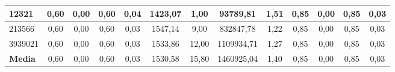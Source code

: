 \documentclass[12pt, spanish]{article}
\begin{document}
\begin{table}[H]
\begin{adjustwidth}{-1.2cm}{-1.2cm}
\begin{tabular}{|l|c|c|c|c|c|c|c|c|c|c|c|c|}
12321                                                   & 0,60                         & 0,00                           & 0,60                      & 0,04                   & 1423,07                      & 1,00                           & 93789,81                  & 1,51                   & 0,85                         & 0,00                           & 0,85                      & 0,03                   \\ \hline
213566                                                  & 0,60                         & 0,00                           & 0,60                      & 0,03                   & 1547,14                      & 9,00                           & 832847,78                 & 1,22                   & 0,85                         & 0,00                           & 0,85                      & 0,03                   \\ \hline
3939021                                                 & 0,60                         & 0,00                           & 0,60                      & 0,03                   & 1533,86                      & 12,00                          & 1109934,71                & 1,27                   & 0,85                         & 0,00                           & 0,85                      & 0,03                   \\ \hline
\textbf{Media}                                          & 0,60                         & 0,00                           & 0,60                      & 0,03                   & 1530,58                      & 15,80                          & 1460925,04                & 1,40                   & 0,85                         & 0,00                           & 0,85                      & 0,03                   \\ \hline
\end{tabular}

\end{adjustwidth}

\end{table}
\end{document}
